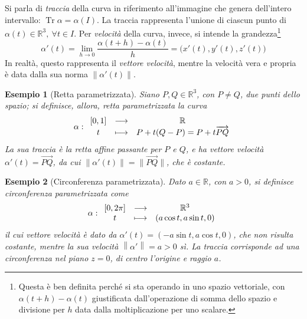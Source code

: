 \documentclass[12pt]{article}
\theoremstyle{style}
\newtheorem{esempio}{Esempio}[section]
\numberwithin{equation}{subsection}
\begin{document}
Si parla di \textit{traccia} della curva in riferimento all'immagine che genera dell'intero intervallo: $\operatorname{Tr} \alpha  = \alpha (I)$.
La traccia rappresenta l'unione di ciascun punto di $\alpha (t) \in \mathbb{R}^3, \ \forall t \in I$.
Per \textit{velocit\`a} della curva, invece, si intende la grandezza\footnote{Questa \`e ben definita perch\'e si sta operando in uno spazio vettoriale, con $\alpha (t+h) - \alpha (t)$ giustificata dall'operazione di somma dello spazio e divisione per $h$ data dalla moltiplicazione per uno scalare.}
\begin{equation}
	\alpha '(t) = \lim_{h \to 0} \frac{\alpha (t + h) - \alpha (t)}{h} = \big(x'(t),y'(t),z'(t)\big)
\end{equation}
In realt\`a, questo rappresenta il \textit{vettore velocit\`a}, mentre la velocit\`a vera e propria \`e data dalla sua norma $\left\lVert \alpha' (t) \right\rVert $.
\begin{esempio}
	[Retta parametrizzata]
	Siano $P,Q \in \mathbb{R}^3$, con $P\neq Q$, due punti dello spazio; si definisce, allora, \textit{retta parametrizzata} la curva 
	\[
		\alpha :
		\begin{array}
			{c c c}
			[0,1] &\longrightarrow & \mathbb{R}\\
			t &\longmapsto & P + t(Q-P) = P+t \overrightarrow{PQ}
		\end{array}
	\] 
La sua traccia \`e la retta affine passante per $P$ e $Q$, e ha vettore velocit\`a $\alpha '(t) = \overrightarrow{PQ}$, da cui $\left\lVert \alpha '(t) \right\rVert = \lVert \overrightarrow{PQ} \rVert$, che \`e costante.
\end{esempio}
\begin{esempio}
	[Circonferenza parametrizzata]
Dato $a\in \mathbb{R}$, con $a > 0$, si definisce \textit{circonferenza parametrizzata} come 
\[
\alpha:
	\begin{array}
		{c c c}
		[0,2\pi] &\longrightarrow & \mathbb{R}^3\\
		t &\longmapsto & (a \cos t, a \sin t , 0)
	\end{array}
\] 
il cui vettore velocit\`a \`e dato da $\alpha '(t) = (-a\sin t, a \cos t, 0)$, che non risulta costante, mentre la sua velocit\`a $\left\lVert \alpha ' \right\rVert = a >0$ s\`i.
La traccia corrisponde ad una circonferenza nel piano $z=0$, di centro l'origine e raggio $a$.
\end{esempio}
\end{document}
